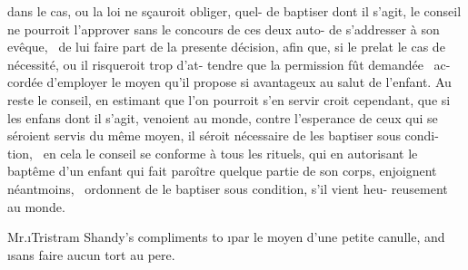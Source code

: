 \documentclass[twoside]{article}
\begin{document}
dans le cas, ou la loi ne sçauroit obliger, quel-\break
{}\break
de baptiser dont il s’agit, le conseil ne pourroit\break
l’approver sans le concours de ces deux auto-\break
{}\break
de s’addresser à son evêque, \et\ de lui faire part\break
de la presente décision, afin que, si le prelat\break
{}\break
{}\break
le cas de nécessité, ou il risqueroit trop d'at-\break
tendre que la permission fût demandée \et\ ac-\break
cordée d’employer le moyen qu’il propose si\break
avantageux au salut de l’enfant. Au reste\break
le conseil, en estimant que l’on pourroit s’en\break
servir croit cependant, que si les enfans dont\break
il s’agit, venoient au monde, contre l’esperance
de ceux qui se séroient servis du même moyen,\break
il séroit nécessaire de les baptiser \textnormal{sous condi-\break
tion,} \et\ en cela le conseil se conforme à tous\break
les rituels, qui en autorisant le baptême d’un\break
enfant qui fait paroître quelque partie de son\break
corps, enjoignent néantmoins, \et\ ordonnent de\break
le baptiser \textnormal{sous condition}, s’il vient heu-\break
reusement au monde. 
\egroup 

\noindent
{}

\bigskip

\vbox{}

\vskip 7pt

Mr.\@ \i{Tristram Shandy}’s compliments to\break
{}
\i{par le moyen d’une} petite canulle, and\break 
\i{sans faire aucun tort au pere.}
\end{document}
